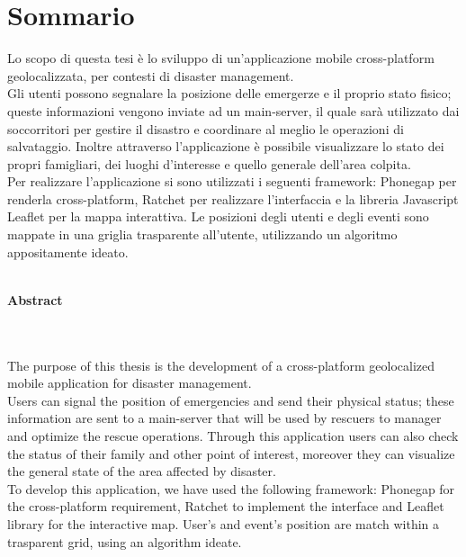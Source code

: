 \chapter*{Sommario}
\thispagestyle{empty}

Lo scopo di questa tesi è lo sviluppo di un'applicazione mobile cross-platform geolocalizzata, per contesti di disaster management.\\
 Gli utenti possono segnalare la posizione delle emergerze e il proprio stato fisico; queste informazioni vengono inviate ad un main-server, il quale sarà utilizzato dai soccorritori per gestire il disastro e coordinare al meglio le operazioni di salvataggio. Inoltre attraverso l'applicazione è possibile visualizzare lo stato dei propri famigliari, dei luoghi d'interesse e quello generale dell'area colpita.\\
 Per realizzare l'applicazione si sono utilizzati i seguenti framework: Phonegap per renderla cross-platform, Ratchet per realizzare l'interfaccia e la libreria Javascript Leaflet per la mappa interattiva. Le posizioni degli utenti e degli eventi sono mappate in una griglia trasparente all'utente, utilizzando un algoritmo appositamente ideato.
\\
\\

\noindent
\begin{Huge}
\textbf{Abstract}
\end{Huge}
\\
\\
\noindent
The purpose of this thesis is the development of a cross-platform geolocalized mobile application for disaster management.\\
 Users can signal the position of emergencies and send their physical status; these information are sent to a main-server that will be used by rescuers to manager and optimize the rescue operations. Through this application users can also check the status of their family and other point of interest, moreover they can visualize the general state of the area affected by disaster.\\
 To develop this application, we have used the following framework: Phonegap for the cross-platform requirement, Ratchet to implement the interface and Leaflet library for the interactive map. User's and event's position are match within a trasparent grid, using an algorithm ideate.


